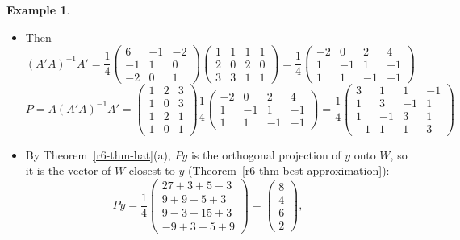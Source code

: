 \documentclass[12pt]{article}
\DeclareMathOperator{\rank}{rank}
\theoremstyle{definition}
\newtheorem{example}[theorem]{Example}
\begin{document}
\begin{example}
\begin{itemize}
\[=\frac14\begin{pmatrix}6&-1&-2\\-1&1&0\\-2&0&1\end{pmatrix}
\]
As \(A'A\) is invertible, \(\rank A=\rank(A'A)=3\) (Theorems~\ref{thm:r4-rank-ata}(b) and~\ref{thm:r4-rank-rules}(d)):
\(A\) has full column rank, and Theorem~\ref{r6-thm-hat} applies.
\item Then
\[
(A'A)^{-1}A'=\frac14\begin{pmatrix}6&-1&-2\\-1&1&0\\-2&0&1\end{pmatrix}\begin{pmatrix}1&1&1&1\\2&0&2&0\\3&3&1&1\end{pmatrix}
=\frac14\begin{pmatrix}-2&0&2&4\\1&-1&1&-1\\1&1&-1&-1\end{pmatrix}
\]
\[
P=A(A'A)^{-1}A'=\begin{pmatrix}1&2&3\\1&0&3\\1&2&1\\1&0&1\end{pmatrix}\frac14\begin{pmatrix}-2&0&2&4\\1&-1&1&-1\\1&1&-1&-1\end{pmatrix}
=\frac14\begin{pmatrix}3&1&1&-1\\1&3&-1&1\\1&-1&3&1\\-1&1&1&3\end{pmatrix}
\]
\item By Theorem~\ref{r6-thm-hat}(a), \(Py\) is the orthogonal projection of \(y\) onto \(W\), so it is the vector of
\(W\) closest to \(y\) (Theorem~\ref{r6-thm-best-approximation}):
\[
Py=\frac14\begin{pmatrix}27+3+5-3\\9+9-5+3\\9-3+15+3\\-9+3+5+9\end{pmatrix}=\begin{pmatrix}8\\4\\6\\2\end{pmatrix},\qquad
\]
\end{itemize}
\end{example}
\end{document}
